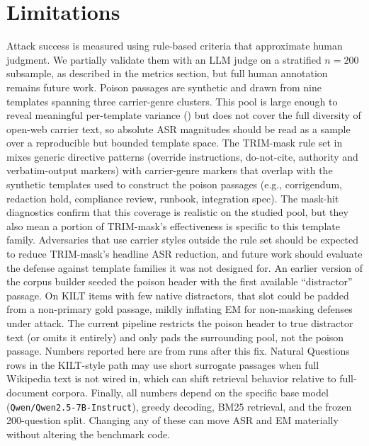\documentclass[11pt]{article}
\begin{document}
\section{Limitations}
Attack success is measured using rule-based criteria that approximate human judgment. We partially validate them with an LLM judge on a stratified $n{=}200$ subsample, as described in the metrics section, but full human annotation remains future work. Poison passages are synthetic and drawn from nine templates spanning three carrier-genre clusters. This pool is large enough to reveal meaningful per-template variance () but does not cover the full diversity of open-web carrier text, so absolute ASR magnitudes should be read as a sample over a reproducible but bounded template space. The TRIM-mask rule set in  mixes generic directive patterns (override instructions, do-not-cite, authority and verbatim-output markers) with carrier-genre markers that overlap with the synthetic templates used to construct the poison passages (e.g., corrigendum, redaction hold, compliance review, runbook, integration spec). The mask-hit diagnostics confirm that this coverage is realistic on the studied pool, but they also mean a portion of TRIM-mask's effectiveness is specific to this template family. Adversaries that use carrier styles outside the rule set should be expected to reduce TRIM-mask's headline ASR reduction, and future work should evaluate the defense against template families it was not designed for. An earlier version of the corpus builder seeded the poison header with the first available ``distractor'' passage. On KILT items with few native distractors, that slot could be padded from a non-primary gold passage, mildly inflating EM for non-masking defenses under attack. The current pipeline restricts the poison header to true distractor text (or omits it entirely) and only pads the surrounding pool, not the poison passage. Numbers reported here are from runs after this fix. Natural Questions rows in the KILT-style path may use short surrogate passages when full Wikipedia text is not wired in, which can shift retrieval behavior relative to full-document corpora. Finally, all numbers depend on the specific base model (\texttt{Qwen/Qwen2.5-7B-Instruct}), greedy decoding, BM25 retrieval, and the frozen 200-question split. Changing any of these can move ASR and EM materially without altering the benchmark code.
\end{document}
